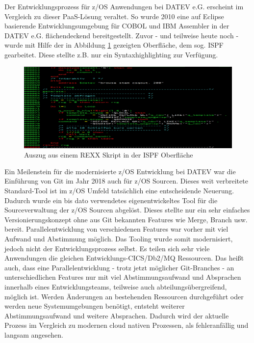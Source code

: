Der Entwicklungsprozess für z/OS Anwendungen bei DATEV e.G. erscheint im Vergleich zu dieser PaaS-Lösung veraltet.
So wurde 2010 eine auf Eclipse basierende Entwicklungsumgebung für COBOL und IBM Assembler in der DATEV e.G. flächendeckend bereitgestellt.
Zuvor - und teilweise heute noch -  wurde mit Hilfe der in Abbildung \ref{fig:3270} gezeigten Oberfläche, dem sog. ISPF gearbeitet.
Diese stellte z.B. nur ein Syntaxhighlighting zur Verfügung.
\begin{figure}[h]
\centering
\includegraphics[width=\textwidth]{figures/rexxintso.png}
\caption{Auszug aus einem REXX Skript in der ISPF Oberfläche}
\label{fig:3270}
\end{figure}
Ein Meilenstein für die modernisierte z/OS Entwicklung bei DATEV war die Einführung von Git im Jahr 2018 auch für z/OS Sourcen. 
Dieses weit verbreitete Standard-Tool ist im z/OS Umfeld tatsächlich eine entscheidende Neuerung.
Dadurch wurde ein bis dato verwendetes eigenentwickeltes Tool für die Sourceverwaltung der z/OS Sourcen abgelöst.
Dieses stellte nur ein sehr einfaches Versionierungskonzept ohne aus Git bekannten Features wie Merge, Branch usw. bereit. 
Parallelentwicklung von verschiedenen Features war vorher mit viel Aufwand und Abstimmung möglich. 
Das Tooling wurde somit modernisiert, jedoch nicht der Entwicklungsprozess selbst.
Es teilen sich sehr viele Anwendungen die gleichen Entwicklungs-CICS/Db2/MQ Ressourcen.
Das heißt auch, dass eine Parallelentwicklung - trotz jetzt möglicher Git-Branches - an unterschiedlichen Features nur mit viel Abstimmungsaufwand und Absprachen innerhalb eines Entwicklungsteams, teilweise auch abteilungsübergreifend, möglich ist.
Werden Änderungen an bestehenden Ressourcen durchgeführt oder werden neue Systemumgebungen benötigt, entsteht weiterer Abstimmungsaufwand und weitere Absprachen.
Dadurch wird der aktuelle Prozess im Vergleich zu modernen cloud nativen Prozessen, als fehleranfällig und langsam angesehen.

